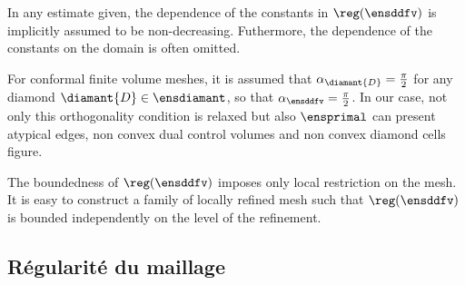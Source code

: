 \begin{envide}[Convention]
    In any estimate given, the dependence of the constants in $\reg(\ensddfv)$ is implicitly assumed to be non-decreasing. Futhermore, the dependence of the constants on the domain is often omitted. 
\end{envide}

\begin{remarque}
    For conformal finite volume meshes, it is assumed that $\alpha_{\diamant{D}} = \frac{\pi}{2}$ for any diamond $\diamant{D} \in \ensdiamant$, so that $\alpha_\ensddfv = \frac{\pi}{2}$. In our case, not only this orthogonality condition is relaxed but also $\ensprimal$ can present atypical edges, non convex dual control volumes and non convex diamond cells {\color{red} figure}.
\end{remarque}

\begin{remarque}
    The boundedness of $\reg(\ensddfv)$ imposes only local restriction on the mesh. It is easy to construct a family of locally refined mesh such that $\reg(\ensddfv)$ is bounded independently on the level of the refinement. 
\end{remarque}

\subsection{Régularité du maillage {\cite[p. 36]{krell_schemas_2010}}}

